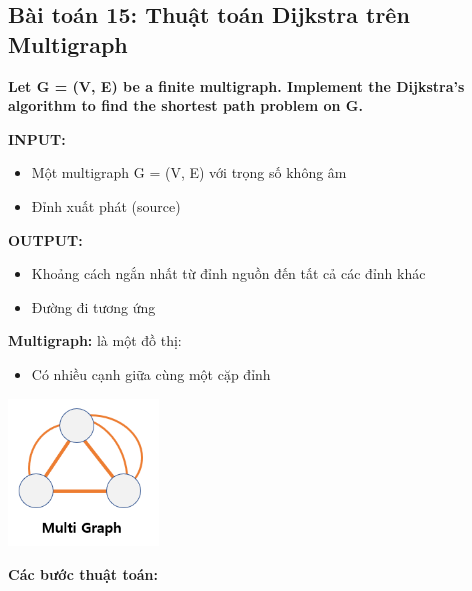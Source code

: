 \documentclass[12pt,a4paper]{article}
\begin{document}
\subsection{Bài toán 15: Thuật toán Dijkstra trên Multigraph}

\begin{problembox}
    \textbf{Let G = (V, E) be a finite multigraph. Implement the Dijkstra's algorithm to find the shortest path problem on G.}
\end{problembox}


\textbf{INPUT:}
\begin{itemize}[label=\textbullet]
    \item Một multigraph G = (V, E) với trọng số không âm
    \item Đỉnh xuất phát (source)
\end{itemize}

\textbf{OUTPUT:}
\begin{itemize}[label=\textbullet]
    \item Khoảng cách ngắn nhất từ đỉnh nguồn đến tất cả các đỉnh khác
    \item Đường đi tương ứng
\end{itemize}

\textbf{Multigraph:} là một đồ thị:
\begin{itemize}[label=\textbullet]
    \item Có nhiều cạnh giữa cùng một cặp đỉnh

\end{itemize}
{\centering
    \includegraphics[width=0.3\textwidth]{assets/image/multigraph.png}
\par}
\vspace{1cm}

\textbf{Các bước thuật toán:}
\end{document}
